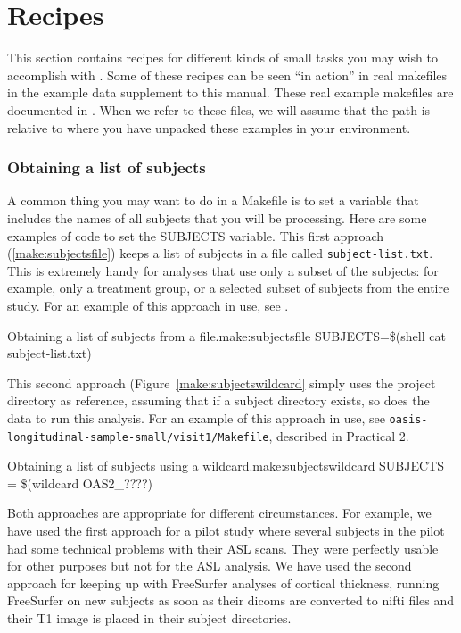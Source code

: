 \chapter{Recipes}
\label{seq:recipes}

This section contains recipes for different kinds of small tasks you may wish to accomplish with \maken{}. Some of these recipes can be seen ``in action'' in real makefiles in the example data supplement to this manual. These real example makefiles are documented in . When we refer to these files, we will assume that the path is relative to where you have unpacked these examples in your environment. 

\subsection{Obtaining a list of subjects}

A common thing you may want to do in a Makefile is to set a variable that includes the names of all subjects that you will be processing. Here are some examples of code to set the SUBJECTS variable. This first approach (\autoref{make:subjectsfile}) keeps a list of subjects in a file called \texttt{subject-list.txt}. 
This is extremely handy for analyses that use only a subset of the subjects: for example, only a treatment group, or a selected subset of subjects from the entire study. For an example of this approach in use, see . 

\begin{make}{Obtaining a list of subjects from a file.}{make:subjectsfile}
  SUBJECTS=\$(shell cat subject-list.txt) 
\end{make}


This second approach (Figure~\ref{make:subjectswildcard} simply uses the project directory as reference, assuming that if a subject directory exists, so does the data to run this analysis. For an example of this approach in use, see \texttt{oasis-longitudinal-sample-small/visit1/Makefile}, described in Practical 2. 

\begin{make}{Obtaining a list of subjects using a wildcard.}{make:subjectswildcard}
SUBJECTS = \$(wildcard OAS2\_????)
\end{make}

Both approaches are appropriate for different circumstances. For example, we have used the first approach for a pilot study where several subjects in the pilot had some technical problems with their ASL scans. They were perfectly usable for other purposes but not for the ASL analysis. We have used the second approach for keeping up with FreeSurfer analyses of cortical thickness, running FreeSurfer on new subjects as soon as their dicoms are converted to nifti files and their T1 image is placed in their subject directories.  

